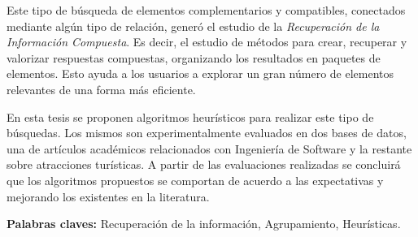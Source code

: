 Este tipo de búsqueda de elementos complementarios y compatibles, conectados mediante algún tipo de relación, generó el estudio de la {\em Recuperación de la Información Compuesta}. Es decir, el estudio de métodos para crear, recuperar y valorizar respuestas compuestas, organizando los resultados en paquetes de elementos. Esto ayuda a los usuarios a explorar un gran número de elementos relevantes de una forma más eficiente.

En esta tesis se proponen algoritmos heurísticos para realizar este tipo de búsquedas. Los mismos son experimentalmente evaluados en dos bases de datos, una de artículos académicos relacionados con Ingeniería de Software y la restante sobre atracciones turísticas. A partir de las evaluaciones realizadas se concluirá que los algoritmos propuestos se comportan de acuerdo a las expectativas y mejorando los existentes en la literatura.
\bigskip



\noindent\textbf{Palabras claves:} Recuperación de la información, Agrupamiento, Heurísticas.